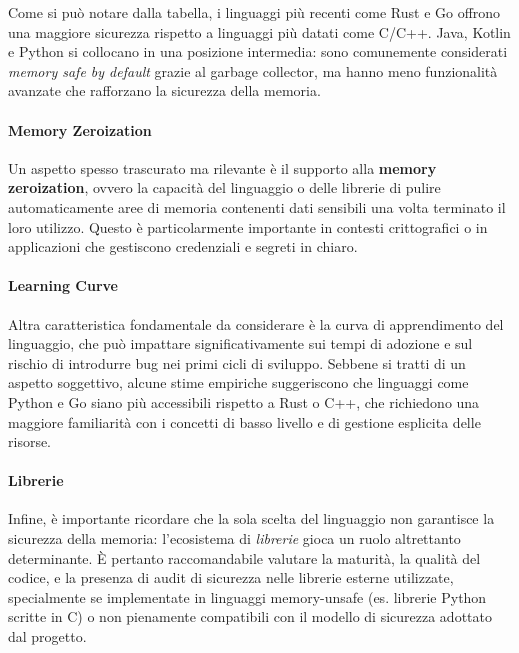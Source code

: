 Come si può notare dalla tabella, i linguaggi più recenti come Rust e Go offrono
una maggiore sicurezza rispetto a linguaggi più datati come C/C++. Java, Kotlin e
Python si collocano in una posizione intermedia: sono comunemente considerati
\textit{memory safe by default} grazie al garbage collector, ma hanno meno
funzionalità avanzate che rafforzano la sicurezza della memoria.

\paragraph{Memory Zeroization}
Un aspetto spesso trascurato ma rilevante è il supporto alla \textbf{memory
zeroization}, ovvero la capacità del linguaggio o delle librerie di pulire automaticamente
aree di memoria contenenti dati sensibili una volta terminato il loro utilizzo.
Questo è particolarmente importante in contesti crittografici o in applicazioni
che gestiscono credenziali e segreti in chiaro.

\paragraph{Learning Curve}
Altra caratteristica fondamentale da considerare è la curva di apprendimento del
linguaggio, che può impattare significativamente sui tempi di adozione e sul
rischio di introdurre bug nei primi cicli di sviluppo. Sebbene si tratti di un aspetto
soggettivo, alcune stime empiriche\cite{learning_curves} suggeriscono che linguaggi
come Python e Go siano più accessibili rispetto a Rust o C++, che richiedono una
maggiore familiarità con i concetti di basso livello e di gestione esplicita
delle risorse.

\paragraph{Librerie}
Infine, è importante ricordare che la sola scelta del linguaggio non garantisce
la sicurezza della memoria: l'ecosistema di \textit{librerie} gioca un ruolo
altrettanto determinante. È pertanto raccomandabile valutare la maturità, la
qualità del codice, e la presenza di audit di sicurezza nelle librerie esterne utilizzate,
specialmente se implementate in linguaggi memory-unsafe (es. librerie Python
scritte in C) o non pienamente compatibili con il modello di sicurezza adottato dal
progetto.

\newpage